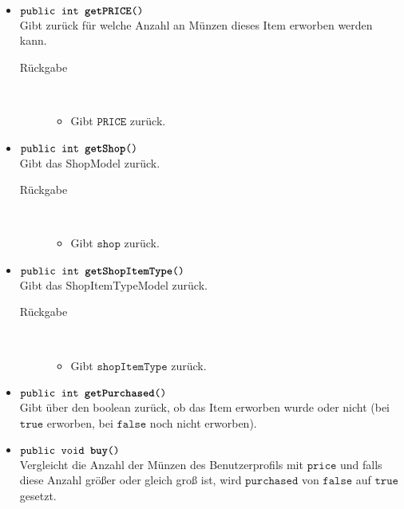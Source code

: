\begin{description}
\begin{itemize}
		\item $\texttt{public int \textbf{getPRICE}()}$ \\ Gibt zurück für welche Anzahl an Münzen dieses Item erworben werden kann.
		\begin{description}
			\item[Rückgabe] \hfill \\
			\vspace{-.8cm}
			\begin{itemize}
				\item Gibt $\texttt{PRICE}$ zurück.
			\end{itemize}
			\end{description}
			
		\item $\texttt{public int \textbf{getShop}()}$ \\ Gibt das ShopModel zurück.
		\begin{description}
			\item[Rückgabe] \hfill \\
			\vspace{-.8cm}
			\begin{itemize}
				\item Gibt $\texttt{shop}$ zurück.
			\end{itemize}
			\end{description}
			
		\item $\texttt{public int \textbf{getShopItemType}()}$ \\ Gibt das ShopItemTypeModel zurück.
		\begin{description}
			\item[Rückgabe] \hfill \\
			\vspace{-.8cm}
			\begin{itemize}
				\item Gibt $\texttt{shopItemType}$ zurück.
			\end{itemize}
			\end{description}
			
		\item $\texttt{public int \textbf{getPurchased}()}$ \\ Gibt über den boolean zurück, ob das Item erworben wurde oder nicht (bei $\texttt{true}$ erworben, bei $\texttt{false}$ noch nicht erworben).
		
			
		\item $\texttt{public void \textbf{buy}()}$ \\ Vergleicht die Anzahl der Münzen des Benutzerprofils mit $\texttt{price}$ und falls diese Anzahl größer oder gleich groß ist, wird $\texttt{purchased}$ von $\texttt{false}$ auf $\texttt{true}$ gesetzt.



\end{itemize}
\end{description}

